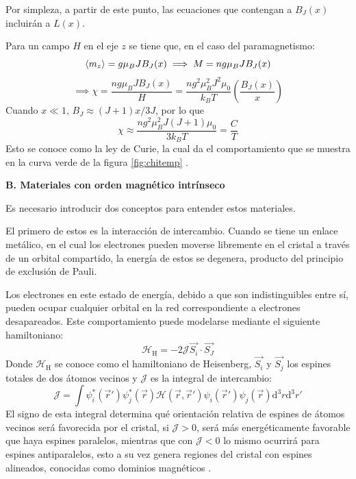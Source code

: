 \documentclass[../main.tex]{subfiles}
\begin{document}
\begin{itemize}
    Por simpleza, a partir de este punto, las ecuaciones que contengan a $B_J(x)$ incluirán a $L(x)$.

    Para un campo $H$ en el eje $z$ se tiene que, en el caso del paramagnetismo:
    \begin{equation}
            \langle m_z \rangle=g\mu_BJB_J(x) \implies M=ng\mu_B J B_J(x)
        \label{eq:momentozetaparam}
    \end{equation}
    \begin{equation}
        \implies \chi=\dfrac{ng\mu_B J B_J(x)}{H}=\dfrac{n g^2 \mu_B^2 J^2 \mu_0}{k_BT}\left(\dfrac{B_J(x)}{x}\right)
        \label{eq:chiparam}
    \end{equation}
    Cuando $x\ll1$, $B_J\approx(J+1)x/3J$, por lo que
    \begin{equation}
        \chi\approx\dfrac{ng^2\mu_B^2J(J+1)\mu_0}{3k_BT}=\dfrac{C}{T}
        \label{eq:leycurie}
    \end{equation}
    Esto se conoce como la ley de Curie, la cual da el comportamiento que se muestra en la curva verde de la figura \ref{fig:chitemp} \cite{coey2010magnetism}.
\end{itemize}
\textbf{B. Materiales con orden magnético intrínseco}

Es necesario introducir dos conceptos para entender estos materiales.

El primero de estos es la interacción de intercambio. Cuando se tiene un enlace metálico, en el cual los electrones pueden moverse libremente en el cristal a través de un orbital compartido, la energía de estos se degenera, producto del principio de exclusión de Pauli.

Los electrones en este estado de energía, debido a que son indistinguibles entre sí, pueden ocupar cualquier orbital en la red correspondiente a electrones desapareados. Este comportamiento puede modelarse mediante el siguiente hamiltoniano:
\begin{equation}
    \mathcal{H}_\text{H}=-2\mathcal{J}\vec{S_i}\cdot\vec{S_J}
    \label{eq:hamiltonianoheisenberg}
\end{equation}
Donde $\mathcal{H}_\text{H}$ se conoce como el hamiltoniano de Heisenberg, $\vec{S_i}$ y $\vec{S_j}$ los espines totales de dos átomos vecinos y $\mathcal{J}$ es la integral de intercambio:
\begin{equation}
    \mathcal{J}=\int \psi^\ast_i(\vec{r}')\psi^\ast_j(\vec{r})\mathcal{H}(\vec{r},\vec{r}')\psi_i(\vec{r}')\psi_j(\vec{r})\text{d}^3r\text{d}^3r'
    \label{eq:intintercambio}
\end{equation}
El signo de esta integral determina qué orientación relativa de espines de átomos vecinos será favorecida por el cristal, si $\mathcal{J}>0$, será más energéticamente favorable que haya espines paralelos, mientras que con $\mathcal{J}<0$ lo mismo ocurrirá para espines antiparalelos, esto a su vez genera regiones del cristal con espines alineados, conocidas como dominios magnéticos \cite{coey2010magnetism}.
\end{document}
